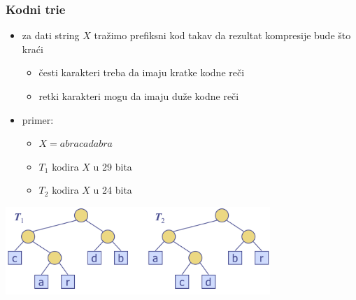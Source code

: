 \documentclass[compress]{beamer}
\begin{document}
\begin{frame}[fragile]
  \frametitle{Kodni trie}
  \begin{itemize}
    \item za dati string $X$ tražimo prefiksni kod takav da rezultat 
    kompresije bude što kraći
    \begin{itemize}
      \item česti karakteri treba da imaju kratke kodne reči
      \item retki karakteri mogu da imaju duže kodne reči
    \end{itemize}
    \item primer:
    \begin{itemize}
      \item $X = abracadabra$
      \item $T_{1}$ kodira $X$ u 29 bita
      \item $T_{2}$ kodira $X$ u 24 bita
    \end{itemize}
  \end{itemize}
  \begin{center}
    \includegraphics[width=10cm]{asp-13-pic27.png}
  \end{center}
\end{frame}
\end{document}
